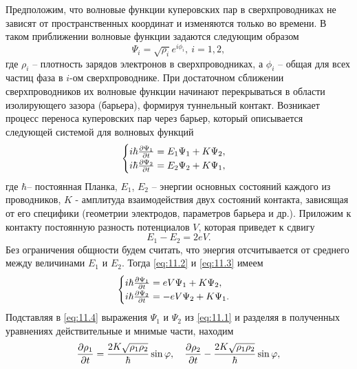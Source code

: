 Предположим, что волновые функции куперовских пар в
сверхпроводниках не зависят от пространственных координат и изменяются
только во времени. В таком приближении волновые функции задаются
следующим образом
\begin{equation}
        \label{eq:11.1}
        \Psi_i = \sqrt{\rho_{i}} e^{i\phi_i},~ i =1,2,
\end{equation}
где $\rho_i$ -- плотность зарядов электронов в сверхпроводниках, а $\phi_i$ -- общая для всех частиц фаза в $i$-ом сверхпроводнике. При достаточном сближении сверхпроводников их волновые функции начинают перекрываться в области
изолирующего зазора (барьера), формируя туннельный контакт. Возникает процесс переноса куперовских пар
через барьер, который описывается следующей системой для волновых функций
\begin{equation}
        \label{eq:11.2}
        \begin{cases}
                i \hbar \pdv{\Psi_1}{t} = E_1 \Psi_1 + K \Psi_2,\\
                i \hbar \pdv{\Psi_2}{t} = E_2 \Psi_2+ K \Psi_1,
        \end{cases}
\end{equation}
где $\hbar$-- постоянная Планка, $E_1$, $E_2$ -- энергии основных состояний каждого из проводников, $K$ - амплитуда взаимодействия двух состояний контакта, зависящая от его специфики (геометрии электродов, параметров барьера и др.). Приложим к контакту постоянную разность потенциалов $V$, которая приведет к сдвигу
\begin{equation}
        \label{eq:11.3}
        E_1-E_2=2eV.
\end{equation}
Без ограничения общности будем считать, что энергия отсчитывается от среднего между величинами $E_1$ и $E_2$. Тогда \eqref{eq:11.2} и \eqref{eq:11.3} имеем
\begin{equation}
        \label{eq:11.4}
        \begin{cases}
                i \hbar \pdv{\Psi_1}{t} = eV\Psi_1+ K\Psi_2,\\
                i \hbar \pdv{\Psi_2}{t} = - eV \Psi_2 + K \Psi_1.
        \end{cases}
\end{equation}
Подставляя в \eqref{eq:11.4} выражения $\Psi_1$ и $\Psi_2$ из \eqref{eq:11.1} и разделяя в полученных
уравнениях действительные и мнимые части, находим
\begin{equation}
        \label{eq:11.5}
        \pdv{\rho_1}{t} = \frac{2K \sqrt{\rho_1\rho_2}}{\hbar} \sin \varphi, \quad
        \pdv{\rho_2}{t} - \frac{2K \sqrt{\rho_1 \rho_2}}{\hbar} \sin \varphi,
\end{equation}
